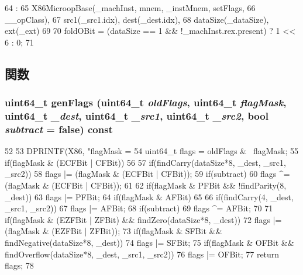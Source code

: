 \begin{DoxyCode}
64                                    :
65             X86MicroopBase(_machInst, mnem, _instMnem, setFlags,
66                     __opClass),
67             src1(_src1.idx), dest(_dest.idx),
68             dataSize(_dataSize), ext(_ext)
69         {
70             foldOBit = (dataSize == 1 && !_machInst.rex.present) ? 1 << 6 : 0;
71         }

\end{DoxyCode}


\subsection{関数}
\hypertarget{classX86ISA_1_1RegOpBase_a19668781839109586f199936333ef8c6}{
\subsubsection[{genFlags}]{\setlength{\rightskip}{0pt plus 5cm}uint64\_\-t genFlags (uint64\_\-t {\em oldFlags}, \/  uint64\_\-t {\em flagMask}, \/  uint64\_\-t {\em \_\-dest}, \/  uint64\_\-t {\em \_\-src1}, \/  uint64\_\-t {\em \_\-src2}, \/  bool {\em subtract} = {\ttfamily false}) const}}
\label{classX86ISA_1_1RegOpBase_a19668781839109586f199936333ef8c6}



\begin{DoxyCode}
52     {
53         DPRINTF(X86, "flagMask = %
54         uint64_t flags = oldFlags & ~flagMask;
55         if(flagMask & (ECFBit | CFBit))
56         {
57             if(findCarry(dataSize*8, _dest, _src1, _src2))
58                 flags |= (flagMask & (ECFBit | CFBit));
59             if(subtract)
60                 flags ^= (flagMask & (ECFBit | CFBit));
61         }
62         if(flagMask & PFBit && !findParity(8, _dest))
63             flags |= PFBit;
64         if(flagMask & AFBit)
65         {
66             if(findCarry(4, _dest, _src1, _src2))
67                 flags |= AFBit;
68             if(subtract)
69                 flags ^= AFBit;
70         }
71         if(flagMask & (EZFBit | ZFBit) && findZero(dataSize*8, _dest))
72             flags |= (flagMask & (EZFBit | ZFBit));
73         if(flagMask & SFBit && findNegative(dataSize*8, _dest))
74             flags |= SFBit;
75         if(flagMask & OFBit && findOverflow(dataSize*8, _dest, _src1, _src2))
76             flags |= OFBit;
77         return flags;
78     }
\end{DoxyCode}


